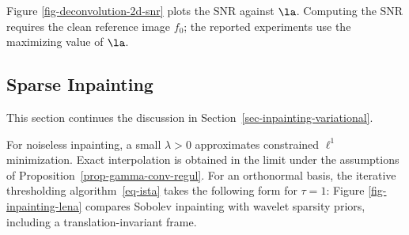 Figure \ref{fig-deconvolution-2d-snr} plots the SNR against $\la$. Computing the SNR requires the clean reference image $f_0$; the reported experiments use the maximizing value of $\la$.



                                
   
                                                                                                                                                                                                                                          
                  



                                      
\subsection{Sparse Inpainting}

This section continues the discussion in Section~\ref{sec-inpainting-variational}.

For noiseless inpainting, a small $\lambda>0$ approximates constrained $\ell^1$ minimization. Exact interpolation is obtained in the limit under the assumptions of Proposition~\ref{prop-gamma-conv-regul}.
For an orthonormal basis, the iterative thresholding algorithm~\eqref{eq-ista} takes the following form for $\tau=1$:
Figure \ref{fig-inpainting-lena} compares Sobolev inpainting with wavelet sparsity priors, including a translation-invariant frame.


